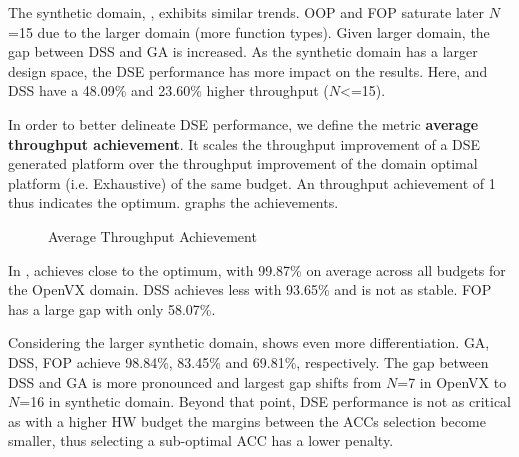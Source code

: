 The synthetic domain, , exhibits similar trends. OOP and FOP saturate later $N$=15 due to the larger domain (more function types). Given larger domain, the gap between DSS and GA is increased. As the synthetic domain has a larger design space, the DSE performance has more impact on the results. Here, \ga and DSS have a 48.09\% and 23.60\% higher throughput ($N$\textless=15).

In order to better delineate DSE performance, we define the metric \textbf{average throughput achievement}. It scales the throughput improvement of a DSE generated platform over the throughput improvement of the domain optimal platform (i.e. Exhaustive) of the same budget. An throughput achievement of 1 thus indicates the optimum.  graphs the achievements.

\begin{figure}[htbp]
	\vspace{-5pt}
	\centering
		\hfill
	\caption{Average Throughput Achievement}
	\label{res:pa}
\end{figure}

In , \ga achieves close to the optimum, with 99.87\% on average across all budgets for the OpenVX domain. DSS achieves less with 93.65\% and is not as stable. FOP has a large gap with only 58.07\%.

Considering the larger synthetic domain,  shows even more differentiation. GA, DSS, FOP achieve 98.84\%, 83.45\% and 69.81\%, respectively. The gap between DSS and GA is more pronounced and largest gap shifts from $N$=7 in OpenVX to $N$=16 in synthetic domain. Beyond that point, DSE performance is not as critical as with a higher HW budget the margins between the ACCs selection become smaller, thus selecting a sub-optimal ACC has a lower penalty.


